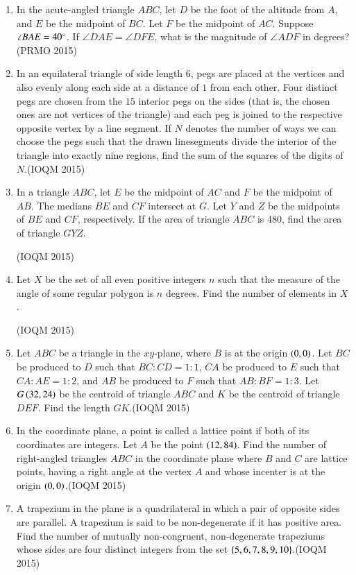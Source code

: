 \begin{enumerate}[label=\thesubsection.\arabic*,ref=\thesubsection.\theenumi]
\item In the acute-angled triangle $ABC$, let $D$ be the foot of the altitude from $A$, and $E$ be the midpoint of $BC$. Let $F$ be the midpoint of $AC$. Suppose $ \angle BAE = 40\degree $. If $ \angle DAE = \angle DFE $, what is the magnitude of $ \angle ADF $ in degrees?
	\hfill(PRMO 2015)
	\item In an equilateral triangle of side length $6$, pegs are placed at the vertices and also evenly along each side at a distance of $1$ from each other. Four distinct pegs are chosen from the $15$ interior pegs on the sides (that is, the chosen ones are not vertices of the triangle) and each peg is joined to the respective opposite vertex by a line segment. If $N$ denotes the number of ways we can choose the pegs such that the drawn linesegments divide the interior of the triangle into exactly nine regions, find the sum of the squares of the digits of $N$.\hfill(IOQM 2015)		
	\item In a triangle $ABC$, let $E$ be the midpoint of $AC$ and $F$ be the midpoint of $AB$. The medians $BE$ and $CF$ intersect at $G$. Let $Y$ and $Z$ be the midpoints of $BE$ and $CF$, respectively. If the area of triangle $ABC$ is 480, find the area of triangle $GYZ$.

		\hfill(IOQM 2015)
    \item Let $X$ be the set of all even positive integers $n$ such that the measure of the angle of some regular polygon is $n$ degrees. Find the number of elements in $X$.

	    \hfill(IOQM 2015)
    \item Let $ABC$ be a triangle in the $xy$-plane, where $B$ is at the origin $\left(0, 0\right)$. Let $BC$ be produced to $D$ such that $BC : CD = 1 : 1$, $CA$ be produced to $E$ such that $CA : AE = 1 : 2$, and $AB$ be produced to $F$ such that $AB : BF = 1 : 3$. Let $G\left(32, 24\right)$ be the centroid of triangle $ABC$ and $K$ be the centroid of triangle $DEF$. Find the length $GK$.\hfill(IOQM 2015)
    
    \item In the coordinate plane, a point is called a lattice point if both of its coordinates are integers. Let $A$ be the point $\left(12, 84\right)$. Find the number of right-angled triangles $ABC$ in the coordinate plane where $B$ and $C$ are lattice points, having a right angle at the vertex $A$ and whose incenter is at the origin $\left(0, 0\right)$.\hfill(IOQM 2015)
    
    \item A trapezium in the plane is a quadrilateral in which a pair of opposite sides are parallel. A trapezium is said to be non-degenerate if it has positive area. Find the number of mutually non-congruent, non-degenerate trapeziums whose sides are four distinct integers from the set $\left\{5, 6, 7, 8, 9, 10\right\}$.\hfill(IOQM 2015)
    

\end{enumerate}
